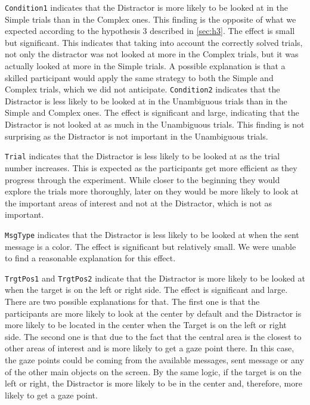 \texttt{Condition1} indicates that the Distractor is more likely to be looked at in the Simple trials than in the Complex ones. This finding is the opposite of what we expected according to the hypothesis 3 described in \autoref{sec:h3}. The effect is small but significant. This indicates that taking into account the correctly solved trials, not only the distractor was not looked at more in the Complex trials, but it was actually looked at more in the Simple trials. A possible explanation is that a skilled participant would apply the same strategy to both the Simple and Complex trials, which we did not anticipate. \texttt{Condition2} indicates that the Distractor is less likely to be looked at in the Unambiguous trials than in the Simple and Complex ones. The effect is significant and large, indicating that the Distractor is not looked at as much in the Unambiguous trials. This finding is not surprising as the Distractor is not important in the Unambiguous trials.

\texttt{Trial} indicates that the Distractor is less likely to be looked at as the trial number increases. This is expected as the participants get more efficient as they progress through the experiment. While closer to the beginning they would explore the trials more thoroughly, later on they would be more likely to look at the important areas of interest and not at the Distractor, which is not as important. 

\texttt{MsgType} indicates that the Distractor is less likely to be looked at when the sent message is a color. The effect is significant but relatively small. We were unable to find a reasonable explanation for this effect.

\texttt{TrgtPos1} and \texttt{TrgtPos2} indicate that the Distractor is more likely to be looked at when the target is on the left or right side. The effect is significant and large. There are two possible explanations for that. The first one is that the participants are more likely to look at the center by default and the Distractor is more likely to be located in the center when the Target is on the left or right side. The second one is that due to the fact that the central area is the closest to other areas of interest and is more likely to get a gaze point there. In this case, the gaze points could be coming from the available messages, sent message or any of the other main objects on the screen. By the same logic, if the target is on the left or right, the Distractor is more likely to be in the center and, therefore, more likely to get a gaze point.

